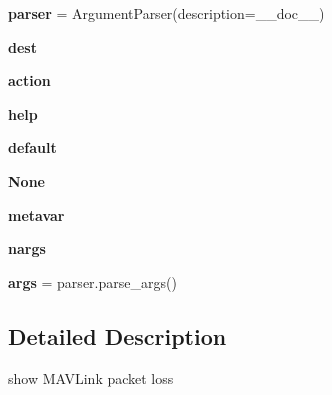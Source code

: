 \begin{DoxyCompactItemize}
\item 
\mbox{\label{namespacepymavlink_1_1tools_1_1mavloss_a18a84b3878825da57160d0632e8ff588}} 
{\bfseries parser} = Argument\+Parser(description=\+\_\+\+\_\+doc\+\_\+\+\_\+)
\item 
\mbox{\label{namespacepymavlink_1_1tools_1_1mavloss_afeaad40440b5921fecfefc93f1c7eb0c}} 
{\bfseries dest}
\item 
\mbox{\label{namespacepymavlink_1_1tools_1_1mavloss_abff94434dd555bd0ba23238ace34276a}} 
{\bfseries action}
\item 
\mbox{\label{namespacepymavlink_1_1tools_1_1mavloss_ab24353ddcd0cce32222d80b6d0c6f5d8}} 
{\bfseries help}
\item 
\mbox{\label{namespacepymavlink_1_1tools_1_1mavloss_a7c23ea39f412ae4fcb49b27358edc6c7}} 
{\bfseries default}
\item 
\mbox{\label{namespacepymavlink_1_1tools_1_1mavloss_a30c16deeeea6d839d98c79ad4ce6641f}} 
{\bfseries None}
\item 
\mbox{\label{namespacepymavlink_1_1tools_1_1mavloss_a69f1ccbd115ecbf2058ebabdc5963701}} 
{\bfseries metavar}
\item 
\mbox{\label{namespacepymavlink_1_1tools_1_1mavloss_ac1b3dfe0b27639570492159679be1dd7}} 
{\bfseries nargs}
\item 
\mbox{\label{namespacepymavlink_1_1tools_1_1mavloss_aed811b3edcca8ba1e47ca484ae0aad4c}} 
{\bfseries args} = parser.\+parse\+\_\+args()
\end{DoxyCompactItemize}


\subsection{Detailed Description}
\begin{DoxyVerb}show MAVLink packet loss
\end{DoxyVerb}
 

